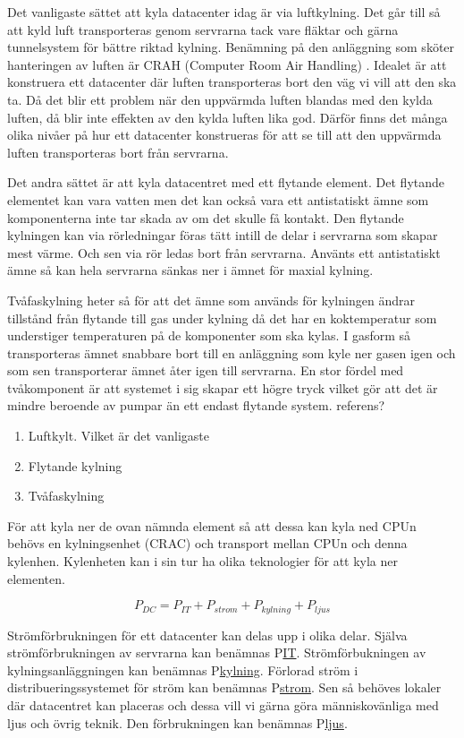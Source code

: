 \documentclass[conference,a4paper]{IEEEtran}
\begin{document}
Det vanligaste sättet att kyla datacenter idag är via luftkylning. Det går till så att kyld luft transporteras genom servrarna 
tack vare fläktar och gärna tunnelsystem för bättre riktad kylning. Benämning på den anläggning som sköter hanteringen av luften
är CRAH (Computer Room Air Handling) \cite{modelling1}. Idealet är att konstruera ett datacenter där luften transporteras bort 
den väg vi vill att den ska ta. Då det blir ett problem när den uppvärmda luften blandas med den kylda luften, då blir inte effekten
av den kylda luften lika god. Därför finns det många olika nivåer på hur ett datacenter konstrueras för att se till att den uppvärmda
luften transporteras bort från servrarna. \cite{modelling2} \cite{}

Det andra sättet är att kyla datacentret med ett flytande element. Det flytande elementet kan vara vatten men det kan också vara ett antistatiskt ämne 
som komponenterna inte tar skada av om det skulle få kontakt. Den flytande kylningen kan via rörledningar föras tätt intill de delar i servrarna som
skapar mest värme. Och sen via rör ledas bort från servrarna. Använts ett antistatiskt ämne så kan hela servrarna sänkas ner i ämnet för maxial kylning. 

Tvåfaskylning heter så för att det ämne som används för kylningen ändrar tillstånd från flytande till gas under kylning då det har en
koktemperatur som understiger temperaturen på de komponenter som ska kylas. I gasform så transporteras ämnet snabbare bort till en anläggning 
som kyle ner gasen igen och som sen transporterar ämnet åter igen till servrarna. En stor fördel med tvåkomponent är att systemet i sig skapar ett 
högre tryck vilket gör att det är mindre beroende av pumpar än ett endast flytande system. referens?

\begin{enumerate}
    \item Luftkylt. Vilket är det vanligaste
    \item Flytande kylning 
    \item Tvåfaskylning
\end{enumerate}

För att kyla ner de ovan nämnda element så att dessa kan kyla ned CPUn behövs en kylningsenhet (CRAC) 
och transport mellan CPUn och denna kylenhen. Kylenheten kan i sin tur ha olika teknologier för
att kyla ner elementen. 

\[P_{DC} = P_{IT} + P_{strom} + P_{kylning} + P_{ljus} \]

Strömförbrukningen för ett datacenter kan delas upp i olika delar. Själva strömförbrukningen av servrarna 
kan benämnas P\underline{IT}. Strömförbukningen av kylningsanläggningen kan benämnas P\underline{kylning}. 
Förlorad ström i distribueringssystemet för ström kan benämnas P\underline{strom}. Sen så behöves lokaler
där datacentret kan placeras och dessa vill vi gärna göra människovänliga med ljus och övrig teknik. Den 
förbrukningen kan benämnas P\underline{ljus}. 
\end{document}
